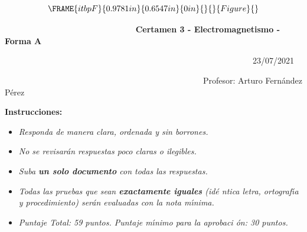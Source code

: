 \documentclass{article}
\begin{document}
\ 
\begin{equation*}
\FRAME{itbpF}{0.9781in}{0.6547in}{0in}{}{}{Figure}{\special{language
"Scientific Word";type "GRAPHIC";maintain-aspect-ratio TRUE;display
"USEDEF";valid_file "T";width 0.9781in;height 0.6547in;depth
0in;original-width 1.1044in;original-height 0.729in;cropleft "0";croptop
"1";cropright "1";cropbottom "0";tempfilename
'QWKCUF03.wmf';tempfile-properties "XPR";}}
\end{equation*}

\ \ \ \ \ \ \ \ \ \ \ \ \ \ \ \ \ \ \ \ \ \ \ \ \ \ \ \ \ \ \ \textbf{%
Certamen 3 - Electromagnetismo - Forma A}

\ \ \ \ \ \ \ \ \ \ \ \ \ \ \ \ \ \ \ \ \ \ \ \ \ \ \ \ \ \ \ \ \ \ \ \ \ \
\ \ \ \ \ \ \ \ \ \ \ \ \ \ \ \ \ \ \ \ \ \ 23/07/2021

\noindent\ \ \ \ \ \ \ \ \ \ \ \ \ \ \ \ \ \ \ \ \ \ \ \ \ \ \ \ \ \ \ \ \ \
\ \ \ \ \ \ \ \ \ \ \ \ \ \ Profesor: Arturo Fern\'{a}ndez P\'{e}rez 

\bigskip

\textbf{Instrucciones: }

\begin{itemize}
\item \emph{Responda de manera clara, ordenada y sin borrones. }

\item \emph{No se revisar\'{a}n respuestas poco claras o ilegibles. }

\item \emph{Suba \textbf{un solo documento} con todas las respuestas. }

\item \emph{Todas las pruebas que sean \textbf{exactamente iguales} (id\'{e}%
ntica letra, ortograf\'{\i}a y procedimiento) ser\'{a}n evaluadas con la
nota m\'{\i}nima.}

\item \emph{Puntaje Total: 59 puntos. Puntaje m\'{\i}nimo para la aprobaci%
\'{o}n: 30 puntos.}
\end{itemize}

\bigskip
\end{document}
